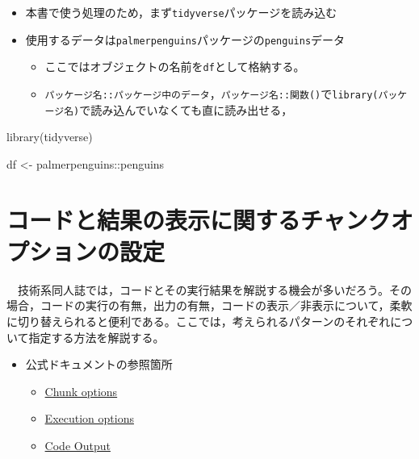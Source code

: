 \documentclass[
  b5paper,
  xelatex, ja=standard]{bxjsbook}
\newenvironment{Shaded}{\begin{snugshade}}{\end{snugshade}}
\newcommand{\FunctionTok}[1]{\textcolor[rgb]{0.28,0.35,0.67}{#1}}
\newcommand{\NormalTok}[1]{\textcolor[rgb]{0.00,0.23,0.31}{#1}}
\newcommand{\OtherTok}[1]{\textcolor[rgb]{0.00,0.23,0.31}{#1}}
\newcommand{\SpecialCharTok}[1]{\textcolor[rgb]{0.37,0.37,0.37}{#1}}
\providecommand{\tightlist}{%
  \setlength{\itemsep}{0pt}\setlength{\parskip}{0pt}}\usepackage{longtable,booktabs,array}
\begin{document}
\begin{itemize}
\tightlist
\item
  本書で使う処理のため，まず\texttt{tidyverse}パッケージを読み込む
\item
  使用するデータは\texttt{palmerpenguins}パッケージの\texttt{penguins}データ

  \begin{itemize}
  \tightlist
  \item
    ここではオブジェクトの名前を\texttt{df}として格納する。
  \item
    \texttt{パッケージ名::パッケージ中のデータ}，\texttt{パッケージ名::関数()}で\texttt{library(パッケージ名)}で読み込んでいなくても直に読み出せる，
  \end{itemize}
\end{itemize}

\begin{Shaded}
\begin{Highlighting}[]
\FunctionTok{library}\NormalTok{(tidyverse)}

\NormalTok{df }\OtherTok{\textless{}{-}} 
\NormalTok{  palmerpenguins}\SpecialCharTok{::}\NormalTok{penguins}
\end{Highlighting}
\end{Shaded}

\section{コードと結果の表示に関するチャンクオプションの設定}\label{ux30b3ux30fcux30c9ux3068ux7d50ux679cux306eux8868ux793aux306bux95a2ux3059ux308bux30c1ux30e3ux30f3ux30afux30aaux30d7ux30b7ux30e7ux30f3ux306eux8a2dux5b9a}

　技術系同人誌では，コードとその実行結果を解説する機会が多いだろう。その場合，コードの実行の有無，出力の有無，コードの表示／非表示について，柔軟に切り替えられると便利である。ここでは，考えられるパターンのそれぞれについて指定する方法を解説する。

\begin{itemize}
\tightlist
\item
  公式ドキュメントの参照箇所

  \begin{itemize}
  \tightlist
  \item
    \href{https://r4ds.hadley.nz/quarto.html\#chunk-options}{Chunk
    options}
  \item
    \href{https://quarto.org/docs/reference/formats/html.html\#execution}{Execution
    options}
  \item
    \href{https://quarto.org/docs/reference/cells/cells-knitr.html\#code-output}{Code
    Output}
  \end{itemize}
\end{itemize}
\end{document}
